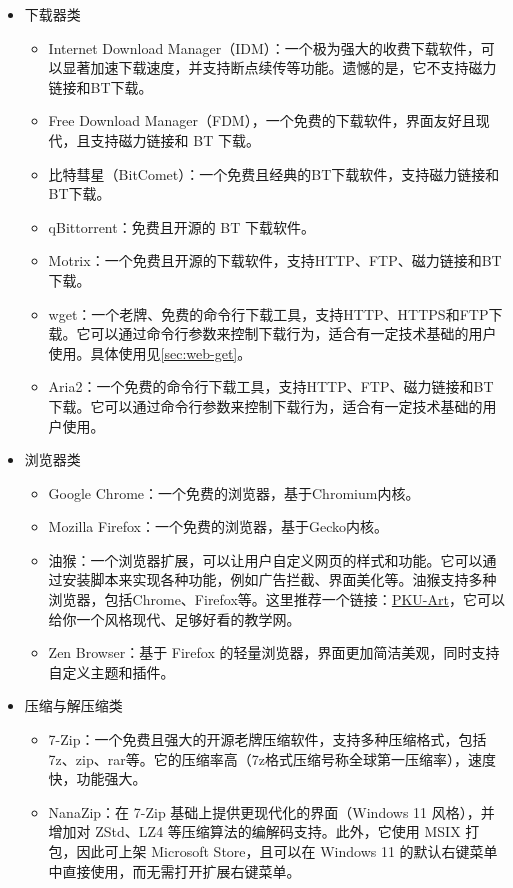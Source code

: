 \begin{itemize}
  \item 下载器类
    \begin{itemize}
      \item Internet Download Manager（IDM）：一个极为强大的收费下载软件，可以显著加速下载速度，并支持断点续传等功能。遗憾的是，它不支持磁力链接和BT下载。
      \item Free Download Manager（FDM），一个免费的下载软件，界面友好且现代，且支持磁力链接和 BT 下载。
      \item 比特彗星（BitComet）：一个免费且经典的BT下载软件，支持磁力链接和BT下载。
      \item qBittorrent：免费且开源的 BT 下载软件。
      \item Motrix：一个免费且开源的下载软件，支持HTTP、FTP、磁力链接和BT下载。
      \item wget：一个老牌、免费的命令行下载工具，支持HTTP、HTTPS和FTP下载。它可以通过命令行参数来控制下载行为，适合有一定技术基础的用户使用。具体使用见\ref{sec:web-get}。
      \item Aria2：一个免费的命令行下载工具，支持HTTP、FTP、磁力链接和BT下载。它可以通过命令行参数来控制下载行为，适合有一定技术基础的用户使用。
    \end{itemize}
  \item 浏览器类
    \begin{itemize}
      \item Google Chrome：一个免费的浏览器，基于Chromium内核。
      \item Mozilla Firefox：一个免费的浏览器，基于Gecko内核。
      \item 油猴：一个浏览器扩展，可以让用户自定义网页的样式和功能。它可以通过安装脚本来实现各种功能，例如广告拦截、界面美化等。油猴支持多种浏览器，包括Chrome、Firefox等。这里推荐一个链接：\href{https://github.com/zhuozhiyongde/PKU-Art}{PKU-Art}，它可以给你一个风格现代、足够好看的教学网。
      \item Zen Browser：基于 Firefox 的轻量浏览器，界面更加简洁美观，同时支持自定义主题和插件。
    \end{itemize}
  \item 压缩与解压缩类
    \begin{itemize}
      \item 7-Zip：一个免费且强大的开源老牌压缩软件，支持多种压缩格式，包括7z、zip、rar等。它的压缩率高（7z格式压缩号称全球第一压缩率），速度快，功能强大。
      \item NanaZip：在 7-Zip 基础上提供更现代化的界面（Windows 11 风格），并增加对 ZStd、LZ4 等压缩算法的编解码支持。此外，它使用 MSIX 打包，因此可上架 Microsoft Store，且可以在 Windows 11 的默认右键菜单中直接使用，而无需打开扩展右键菜单。

\end{itemize}
\end{itemize}
